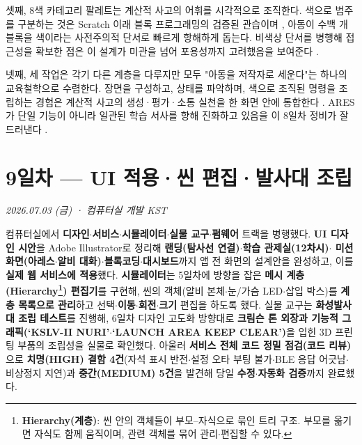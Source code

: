 셋째, 8색 카테고리 팔레트는 계산적 사고의 어휘를 시각적으로 조직한다. 색으로 범주를 구분하는 것은 Scratch 이래 블록 프로그래밍의 검증된 관습이며 \cite{resnick2009scratch, maloney2010scratch}, 아동이 수백 개 블록을 색이라는 사전주의적 단서로 빠르게 항해하게 돕는다. 비색상 단서를 병행해 접근성을 확보한 점은 이 설계가 미관을 넘어 포용성까지 고려했음을 보여준다 \cite{wcag21}.

넷째, 세 작업은 각기 다른 계층을 다루지만 모두 "아동을 저작자로 세운다"는 하나의 교육철학으로 수렴한다. 장면을 구성하고, 상태를 파악하며, 색으로 조직된 명령을 조립하는 경험은 계산적 사고의 생성·평가·소통 실천을 한 화면 안에 통합한다 \cite{brennan2012ct, grover2013ct, wing2006ct}. ARES가 단일 기능이 아니라 일관된 학습 서사를 향해 진화하고 있음을 이 8일차 정비가 잘 드러낸다 \cite{ares-repo}.

\chapter{9일차 — UI 적용·씬 편집·발사대 조립}
\textit{2026.07.03 (금) · 컴퓨터실 개발 KST}

\begin{summarybox}
컴퓨터실에서 \textbf{디자인$\cdot$서비스$\cdot$시뮬레이터$\cdot$실물 교구$\cdot$펌웨어} 트랙을 병행했다.
\textbf{UI 디자인 시안}을 Adobe Illustrator로 정리해 \textbf{랜딩(탐사선 연결)$\cdot$학습 관제실(12차시)$\cdot$%
미션 화면(아레스$\cdot$알비 대화)$\cdot$블록코딩$\cdot$대시보드}까지 앱 전 화면의 설계안을 완성하고,
이를 \textbf{실제 웹 서비스에 적용}했다. \textbf{시뮬레이터}는 5일차에 방향을 잡은 \textbf{메시
계층(Hierarchy\footnote{\textbf{Hierarchy(계층)}: 씬 안의 객체들이 부모--자식으로 묶인 트리
구조. 부모를 옮기면 자식도 함께 움직이며, 관련 객체를 묶어 관리$\cdot$편집할 수 있다.}) 편집기}를 구현해, 씬의 객체(알비 본체$\cdot$눈/가슴 LED$\cdot$삽입 박스)를
\textbf{계층 목록으로 관리}하고 선택$\cdot$\textbf{이동$\cdot$회전$\cdot$크기} 편집을 하도록 했다.
실물 교구는 \textbf{화성발사대 조립 테스트}를 진행해, 6일차 디자인 고도화 방향대로 \textbf{크림슨 톤
외장과 기능적 그래픽(‘KSLV-II NURI’$\cdot$‘LAUNCH AREA KEEP CLEAR’)}을 입힌 3D 프린팅
부품의 조립성을 실물로 확인했다. 아울러 \textbf{서비스 전체 코드 정밀 점검(코드 리뷰)}으로
\textbf{치명(HIGH) 결함 4건}(자석 표시 반전$\cdot$설정 오타 부팅 불가$\cdot$BLE 응답 어긋남$\cdot$%
비상정지 지연)과 \textbf{중간(MEDIUM) 5건}을 발견해 당일 \textbf{수정$\cdot$자동화 검증}까지 완료했다.
\end{summarybox}


